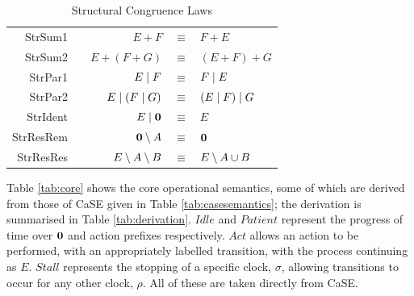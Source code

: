 \begin{table}
 \caption{Structural Congruence Laws}
 \label{tab:structcong}
  \shrule \centering
  \begin{tabular}{rcrcl}
  StrSum1 & \quad\quad &  
  $E + F$              & $\equiv$ & $F + E$
\\
  StrSum2 &&  
  $E + (F + G)$        & $\equiv$ & $(E + F) + G$
\\
  StrPar1 &&  
  $E \;|\; F$            & $\equiv$ & $F \;|\; E$
\\
  StrPar2 &&  
  $E \;|\; (F \;|\; G)$    & $\equiv$ & $(E \;|\; F) \;|\; G$
\\
  StrIdent &&  
  $E \;|\; \textbf{0}$         & $\equiv$ & $E$
\\
  StrResRem &&  
  $\textbf{0} \setminus {A}$       & $\equiv$ & $\textbf{0}$
\\
  StrResRes &&  
  $E \setminus {A} \setminus {B}$  & $\equiv$ & $E \setminus {A \cup B}$
  \end{tabular}
  \shrule
\end{table}


Table \ref{tab:core} shows the core operational semantics, some of
which are derived from those of CaSE given in Table
\ref{tab:casesemantics}; the derivation is summarised in Table
\ref{tab:derivation}.  $Idle$ and $Patient$ represent the progress of
time over $\textbf{0}$ and action prefixes respectively.  $Act$ allows an
action to be performed, with an appropriately labelled transition,
with the process continuing as $E$.  $Stall$ represents the stopping
of a specific clock, $\sigma$, allowing transitions to occur for any
other clock, $\rho$.  All of these are taken directly from CaSE.


